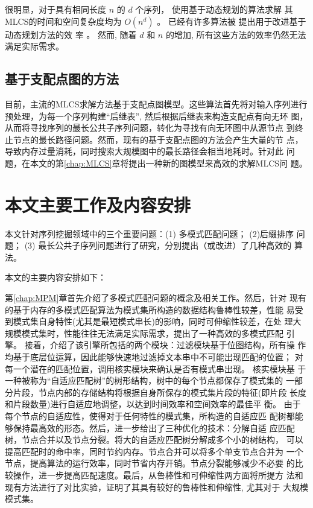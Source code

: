 很明显，对于具有相同长度 $n$ 的 $d$ 个序列， 使用基于动态规划的算法求解
其MLCS的时间和空间复杂度均为 $O(n^d)$ \cite{Hsu1984}。 已经有许多算法被
提出用于改进基于动态规划方法的效
率 \cite{Hirschberg1977,Apostolico1992,Masek1980,Rick1994}。 然而, 随着
$d$ 和 $n$ 的增加, 所有这些方法的效率仍然无法满足实际需求。

\subsection{基于支配点图的方法}
\label{sec:DP}

目前，主流的MLCS求解方法基于支配点图模型。这些算法首先将对输入序列进行
预处理，为每一个序列构建“后继表”, 然后根据后继表来构造支配点有向无环
图，从而将寻找序列的最长公共子序列问题，转化为寻找有向无环图中从源节点
到终止节点的最长路径问题。然而，现有的基于支配点图的方法会产生大量的节
点，导致内存过量消耗，同时搜索大规模图中的最长路径会相当地耗时。针对此
问题，在本文的第\ref{chap:MLCS}章将提出一种新的图模型来高效的求解MLCS问
题。


\section{本文主要工作及内容安排}
\label{sec:org}

本文针对序列挖掘领域中的三个重要问题：(1) 多模式匹配问题； (2)后缀排序
问题； (3) 最长公共子序列问题进行了研究，分别提出（或改进）了几种高效的
算法。

本文的主要内容安排如下：

第\ref{chap:MPM}章首先介绍了多模式匹配问题的概念及相关工作。然后，针对
现有的基于内存的多模式匹配算法为模式集所构造的数据结构鲁棒性较差，性能
易受到模式集自身特性(尤其是最短模式串长)的影响，同时可伸缩性较差，在处
理大规模模式集时，性能往往无法满足实际需求，提出了一种高效的多模式匹配
引擎。 接着，介绍了该引擎所包括的两个模块：过滤模块基于位图结构，所有操
作均基于底层位运算，因此能够快速地过滤掉文本串中不可能出现匹配的位置；
对每一个潜在的匹配位置，调用核实模块来确认是否有模式串出现。 核实模块基
于一种被称为“自适应匹配树”的树形结构，树中的每个节点都保存了模式集的
一部分片段，节点内部的存储结构将根据自身所保存的模式集片段的特征(即片段
长度和片段数量)进行自适应地调整，以达到时间效率和空间效率的最佳平
衡。 由于每个节点的自适应性，使得对于任何特性的模式集，所构造的自适应匹
配树都能够保持最高效的形态。然后，进一步给出了三种优化的技术：分解自适
应匹配树，节点合并以及节点分裂。将大的自适应匹配树分解成多个小的树结构，
可以提高匹配时的命中率，同时节约内存。节点合并可以将多个单支节点合并为
一个节点，提高算法的运行效率，同时节省内存开销。节点分裂能够减少不必要
的比较操作，进一步提高匹配速度。最后，从鲁棒性和可伸缩性两方面将所提方
法和现有方法进行了对比实验，证明了其具有较好的鲁棒性和伸缩性, 尤其对于
大规模模式集。

